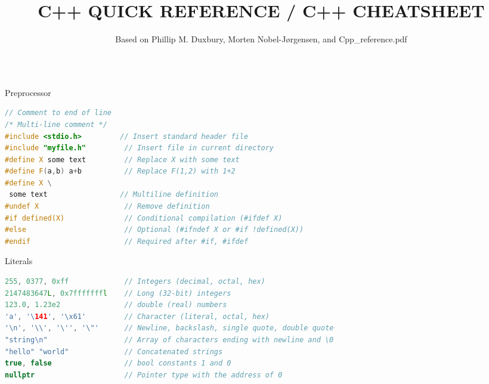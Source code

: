 \documentclass[final]{beamer}
\title{C++ QUICK REFERENCE / C++ CHEATSHEET}
\author{Based on Phillip M. Duxbury, Morten Nobel-Jørgensen, and Cpp\_reference.pdf}
\begin{document}
\begin{frame}[t,fragile]

\begin{columns}[t,totalwidth=\paperwidth, colsep=0.015\paperwidth]

\begin{column}{0.32\paperwidth}

\begin{block}{Preprocessor}
\begin{lstlisting}[language=C++]
// Comment to end of line
/* Multi-line comment */
#include <stdio.h>         // Insert standard header file
#include "myfile.h"         // Insert file in current directory
#define X some text         // Replace X with some text
#define F(a,b) a+b          // Replace F(1,2) with 1+2
#define X \
 some text                 // Multiline definition
#undef X                    // Remove definition
#if defined(X)              // Conditional compilation (#ifdef X)
#else                       // Optional (#ifndef X or #if !defined(X))
#endif                      // Required after #if, #ifdef
\end{lstlisting}
\end{block}

\begin{block}{Literals}
\begin{lstlisting}[language=C++]
255, 0377, 0xff             // Integers (decimal, octal, hex)
2147483647L, 0x7fffffffl    // Long (32-bit) integers
123.0, 1.23e2               // double (real) numbers
'a', '\141', '\x61'         // Character (literal, octal, hex)
'\n', '\\', '\'', '\"'      // Newline, backslash, single quote, double quote
"string\n"                  // Array of characters ending with newline and \0
"hello" "world"             // Concatenated strings
true, false                 // bool constants 1 and 0
nullptr                     // Pointer type with the address of 0
\end{lstlisting}
\end{block}


\end{column}
\end{columns}
\end{frame}
\end{document}
